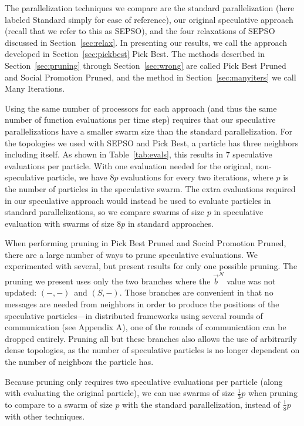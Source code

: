 \documentclass[ms,electronic,twosidetoc,letterpaper,chaptercenter,parttop,equalmargins]{byumsphd}
\renewcommand{\sec}[1]{Section~\ref{sec:#1}}
\providecommand{\neigh}{\ensuremath{N}}
\providecommand{\nbest}{\ensuremath{\Vec{b}^\neigh}}
\providecommand{\casexn}{\ensuremath{(S,-)}}
\providecommand{\casepn}{\ensuremath{(-,-)}}
\begin{document}
The parallelization techniques we compare are the standard parallelization
(here labeled Standard simply for ease of reference), our original speculative
approach (recall that we refer to this as SEPSO), and the four relaxations of
SEPSO discussed in \sec{relax}.  In presenting our results, we call the
approach developed in \sec{pickbest} Pick Best.  The methods described in
\sec{pruning} through \sec{wrong} are called Pick Best Pruned and Social
Promotion Pruned, and the method in \sec{manyiters} we call Many Iterations.

Using the same number of processors for each approach (and thus the same number
of function evaluations per time step) requires that our speculative
parallelizations have a smaller swarm size than the standard parallelization.
For the topologies we used with SEPSO and Pick Best, a particle has three
neighbors including itself.  As shown in Table~\ref{tab:evals}, this results in
$7$ speculative evaluations per particle.  With one evaluation needed for the
original, non-speculative particle, we have $8p$ evaluations for every two
iterations, where $p$ is the number of particles in the speculative swarm.  The
extra evaluations required in our speculative approach would instead be used to
evaluate particles in standard parallelizations, so we compare swarms of size
$p$ in speculative evaluation with swarms of size $8p$ in standard approaches.

When performing pruning in Pick Best Pruned and Social Promotion Pruned, there
are a large number of ways to prune speculative evaluations.  We experimented
with several, but present results for only one possible pruning.  The pruning
we present uses only the two branches where the $\nbest$ value was not updated:
\casepn\ and \casexn.  Those branches are convenient in that no messages are
needed from neighbors in order to produce the positions of the speculative
particles---in distributed frameworks using several rounds of communication
(see Appendix A), one of the rounds of communication can be dropped entirely.
Pruning all but these branches also allows the use of arbitrarily dense
topologies, as the number of speculative particles is no longer dependent on
the number of neighbors the particle has.

Because pruning only requires two speculative evaluations per particle (along
with evaluating the original particle), we can use swarms of size
$\frac{1}{3}p$ when pruning to compare to a swarm of size $p$ with the standard
parallelization, instead of $\frac{1}{8}p$ with other techniques.
\end{document}
